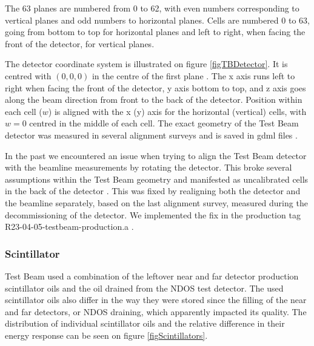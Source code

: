 \documentclass[12pt,a4paper]{article}
\begin{document}
The 63 planes are numbered from 0 to 62, with even numbers corresponding to vertical planes and odd numbers to horizontal planes. Cells are numbered 0 to 63, going from bottom to top for horizontal planes and left to right, when facing the front of the detector, for vertical planes.

The detector coordinate system is illustrated on figure \ref{figTBDetector}. It is centred with $\left(0,0,0\right)$ in the centre of the first plane \cite{NOVA-doc-58388}. The x axis runs left to right when facing the front of the detector, y axis bottom to top, and z axis goes along the beam direction from front to the back of the detector. Position within each cell ($w$) is aligned with the x (y) axis for the horizontal (vertical) cells, with $w=0$ centred in the middle of each cell. The exact geometry of the Test Beam detector was measured in several alignment surveys and is saved in gdml files \cite{NOVA-doc-57955}.

In the past we encountered an issue when trying to align the Test Beam detector with the beamline measurements by rotating the detector. This broke several assumptions within the Test Beam geometry \cite{NOVA-doc-58388} and manifested as uncalibrated cells in the back of the detector \cite{NOVA-doc-57516-v2}. This was fixed by realigning both the detector and the beamline separately, based on the last alignment survey, measured during the decommissioning of the detector. We implemented the fix in the production tag R23-04-05-testbeam-production.a \cite{NOVA-doc-58388}.


\subsubsection*{Scintillator}

Test Beam used a combination of the leftover near and far detector production scintillator oils and the oil drained from the NDOS test detector. The used scintillator oils also differ in the way they were stored since the filling of the near and far detectors, or NDOS draining, which apparently impacted its quality. The distribution of individual scintillator oils and the relative difference in their energy response can be seen on figure \ref{figScintillators}.
\end{document}
